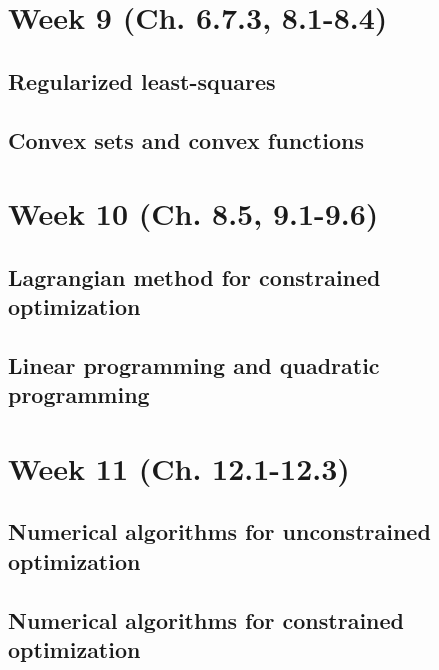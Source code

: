 \documentclass{article}
\begin{document}
\section{Week 9 (Ch. 6.7.3, 8.1-8.4)}
    \subsection{Regularized least-squares}
    \subsection{Convex sets and convex functions}

\section{Week 10 (Ch. 8.5, 9.1-9.6)}
    \subsection{Lagrangian method for constrained optimization}
    \subsection{Linear programming and quadratic programming}

\section{Week 11 (Ch. 12.1-12.3)}
    \subsection{Numerical algorithms for unconstrained optimization}
    \subsection{Numerical algorithms for constrained optimization}
\end{document}
